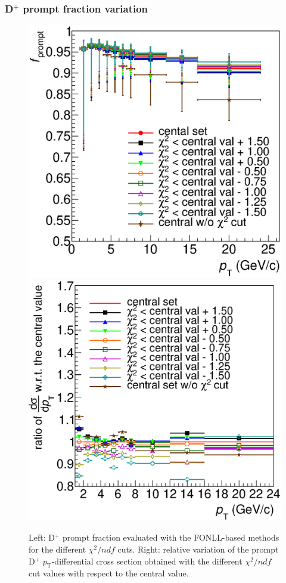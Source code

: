 \documentclass[b5paper,10pt,twoside,oldstyle,classica]{toptesi}
\newcommand{\pt}{p_\text{T}}
\begin{document}
\subsubsection{D$^+$ prompt fraction variation}
\begin{figure}[b]
\begin{center}
{\includegraphics[scale = 0.31]{KF_CutVarSyst_promptfrac_chiS.eps}}
\hspace{-0.5cm}
{\includegraphics[scale = 0.31]{KF_CutVarSyst_ratioonly_chiS.eps}}
\caption{Left: D$^+$ prompt fraction evaluated with the FONLL-based methods for the different $\chi^2/ndf$ cuts. Right: relative variation of the prompt D$^+$ $\pt$-differential cross section obtained with the different $\chi^2/ndf$ cut values with respect to the central value.}
\label{KF_chivar_promptfrac}
\end{center}
\end{figure} 
\end{document}
